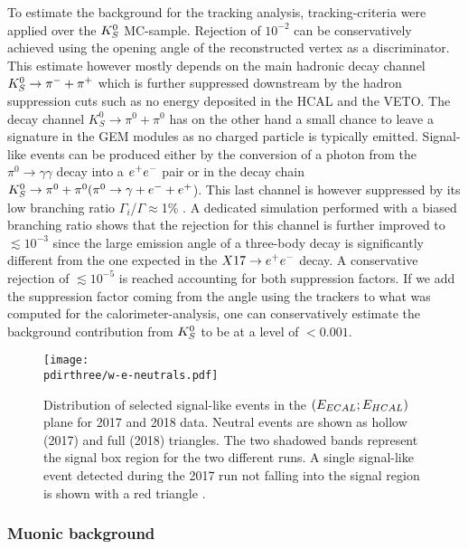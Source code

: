 To estimate the background for the tracking analysis, tracking-criteria were applied over the $K^0_S$ MC-sample. Rejection of $10^{-2}$ can be conservatively achieved using the opening angle of the reconstructed vertex as a discriminator. This estimate however mostly depends on the main hadronic decay channel $K^0_S \rightarrow \pi^- + \pi^+$ which is further suppressed downstream by the hadron suppression cuts such as no energy deposited in the HCAL and the VETO. The decay channel $K^0_S \rightarrow \pi^0 + \pi^0$ has on the other hand a small chance to leave a signature in the GEM modules as no charged particle is typically emitted. Signal-like events can be produced either by the conversion of a photon from the $\pi^0 \rightarrow \gamma \gamma$ decay into a $e^+e^-$ pair or in the decay chain $K^0_S \rightarrow \pi^0 + \pi^0 (\pi^0 \rightarrow \gamma + e^- + e^+$). This last channel is however suppressed by its low branching ratio $\Gamma_i$/$\Gamma \approx $1\% \cite{review-particle-physics}. A dedicated simulation performed with a biased branching ratio shows that the rejection for this channel is further improved to $\lesssim 10^{-3}$ since the large emission angle of a three-body decay is significantly different from the one expected in the $X17 \rightarrow e^+ e^-$ decay. A conservative rejection of $\lesssim 10^{-5}$ is reached accounting for both suppression factors. If we add the suppression factor coming from the angle using the trackers to what was computed for the calorimeter-analysis, one can conservatively estimate the background contribution from $K^0_S$ to be at a level of $<0.001$.


\begin{figure}[bth!]
  \centering
  \texttt{[image: \\pdirthree/w-e-neutrals.pdf]}
  \caption[neutral events in visible mode]{Distribution of selected signal-like events in the $(E_{ECAL};E_{HCAL})$ plane for 2017 and 2018 data. Neutral events are shown as hollow (2017) and full (2018) triangles. The two shadowed bands represent the signal box region for the two different runs. A single signal-like event detected during the 2017 run not falling into the signal region is shown with a red triangle \cite{Banerjee:2019hmi}.}
  \label{fig:w-e-vis}
\end{figure}

\subsubsection{Muonic background}
\label{ch3:sec:bkg:vis:muon}

